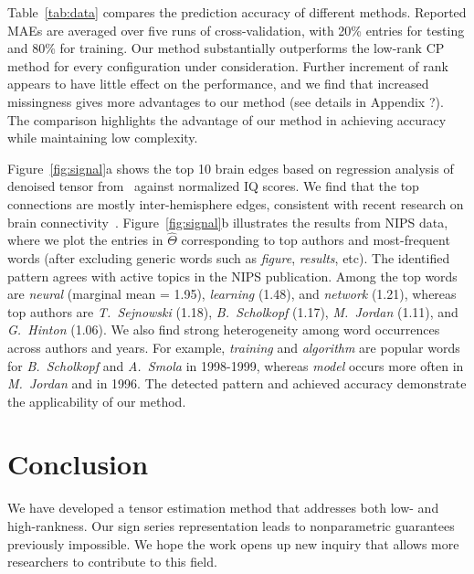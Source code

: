 \documentclass{article}
\theoremstyle{plain}
\theoremstyle{definition}
\def\NonParaT{\text{\bf \footnotesize NonparaT}}
\begin{document}
Table~\ref{tab:data} compares the prediction accuracy of different methods. Reported MAEs are averaged over five runs of cross-validation, with 20\% entries for testing and 80\% for training. Our method substantially outperforms the low-rank CP method for every configuration under consideration. Further increment of rank appears to have little effect on the performance, and we find that increased missingness gives more advantages to our method (see details in Appendix {\color{red}?}). The comparison highlights the advantage of our method in achieving accuracy while maintaining low complexity. 

Figure~\ref{fig:signal}a shows the top 10 brain edges based on regression analysis of denoised tensor from \NonParaT\ against normalized IQ scores. We find that the top connections are mostly inter-hemisphere edges, consistent with recent research on brain connectivity~\cite{li2009brain,wang2017bayesian}. Figure~\ref{fig:signal}b illustrates the results from NIPS data, where we plot the entries in $\hat \Theta$ corresponding to top authors and most-frequent words (after excluding generic words such as \emph{figure}, \emph{results}, etc). The identified pattern agrees with active topics in the NIPS publication. Among the top words are \emph{neural} (marginal mean = 1.95), \emph{learning} (1.48), and \emph{network} (1.21), whereas top authors are \emph{T.\ Sejnowski} (1.18), \emph{B.~Scholkopf} (1.17), \emph{M.\ Jordan} (1.11), and \emph{G.\ Hinton} (1.06). We also find strong heterogeneity among word occurrences across authors and years. For example, \emph{training} and \emph{algorithm} are popular words for \emph{B.\ Scholkopf} and \emph{A.\ Smola} in 1998-1999, whereas \emph{model} occurs more often in \emph{M.\ Jordan} and in 1996. The detected pattern and achieved accuracy demonstrate the applicability of our method.


\vspace{-.1cm}
\section{Conclusion}
\vspace{-.2cm}
We have developed a tensor estimation method that addresses both low- and high-rankness. Our sign series representation leads to nonparametric guarantees previously impossible. We hope the work opens up new inquiry that allows more researchers to contribute to this field.



\end{document}
